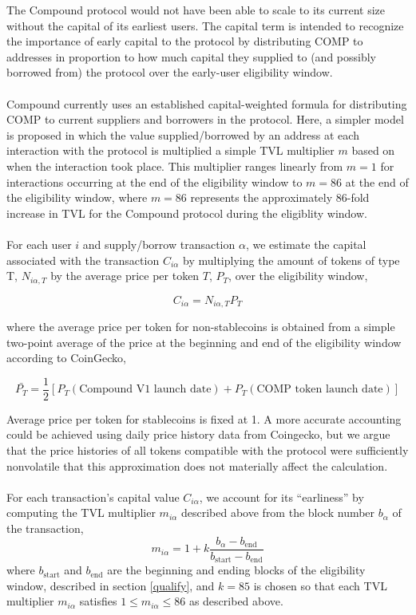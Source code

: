 \documentclass[12pt]{article}
\begin{document}
The Compound protocol would not have been able to scale to its current size without
the capital of its earliest users. The capital term is intended to recognize the
importance of early capital to the protocol by distributing COMP to addresses in
proportion to how much capital they supplied to (and possibly borrowed from) the
protocol over the early-user eligibility window.
\\\\
Compound currently uses an established capital-weighted formula for distributing
COMP to current suppliers and borrowers in the protocol. Here, a simpler model is
proposed in which the value supplied/borrowed by an address at each interaction
with the protocol is multiplied a simple TVL multiplier $m$ based on
when the interaction took place. This multiplier ranges linearly from $m = 1$
for interactions occurring at the end of the eligibility window to $m = 86$ at the
end of the eligibility window, where $m = 86$ represents the approximately 86-fold
increase in TVL for the Compound protocol during the eligiblity window.
\\\\
For each user $i$ and supply/borrow transaction $\alpha$, we estimate the capital
associated with the transaction $C_{i\alpha}$ by multiplying the amount of tokens
of type T, $N_{i\alpha,T}$ by the average price per token $T$, $P_T$, over the eligibility window,

\begin{equation*}
  C_{i\alpha} = N_{i\alpha,T}P_T
\end{equation*}

where the average price per token for non-stablecoins is obtained from a simple two-point average
of the price at the beginning and end of the eligibility window according to CoinGecko,

\begin{equation*}
  \bar{P_T} = \frac{1}{2}\left[P_T(\textrm{Compound V1 launch date}) + P_T(\textrm{COMP token launch date})\right]
\end{equation*}

Average price per token for stablecoins is fixed at 1. 
A more accurate accounting could be achieved using daily price history data from Coingecko,
but we argue that the price histories of all tokens compatible with the protocol were
sufficiently nonvolatile that this approximation does not materially affect the calculation.
\\\\
For each transaction's capital value $C_{i\alpha}$, we account for its ``earliness'' by
computing the TVL multiplier $m_{i\alpha}$ described above from the block number $b_{\alpha}$ of the transaction,
\begin{equation*}
  m_{i\alpha} = 1 + k\frac{b_{\alpha} - b_{\textrm{end}}}
                     {b_{\textrm{start}}-b_{\textrm{end}}}
\end{equation*}
where $b_{\textrm{start}}$ and $b_{\textrm{end}}$ are the beginning and ending blocks of the
eligibility window, described in section \ref{qualify}, and $k=85$ is chosen so that each TVL
multiplier $m_{i\alpha}$ satisfies $1 \leq m_{i\alpha} \leq 86$ as described above.
\end{document}
